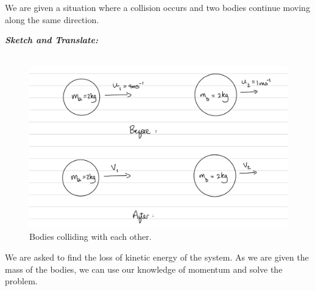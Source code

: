 %
%
%

\begin{subquestions}
	
\subquestion


\begin{subsubquestions}
	
\subsubquestion

We are given a situation where a collision occurs and two bodies continue moving along the same direction.

\textbf{\textit{Sketch and Translate:}} \\ \\
\begin{figure}[H]
	\begin{center}
		\includegraphics[scale=0.25]{../2007/figures/2008Mq5-1}
		\caption{\label{2008M:q5:Sketch1} Bodies colliding with each other.}
	\end{center}
\end{figure}	
We are asked to find the loss of kinetic energy of the system. As we are given the mass of the bodies, we can use our knowledge of momentum and solve the problem. 




\end{subsubquestions}
\end{subquestions}

